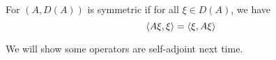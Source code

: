 \begin{definition}
    For $(A,D(A))$ is symmetric if for all $\xi\in D(A)$, we have
    \begin{equation*}
        \langle A\xi, \xi\rangle=\langle \xi, A\xi\rangle
    \end{equation*}
\end{definition}
We will show some operators are self-adjoint next time.

